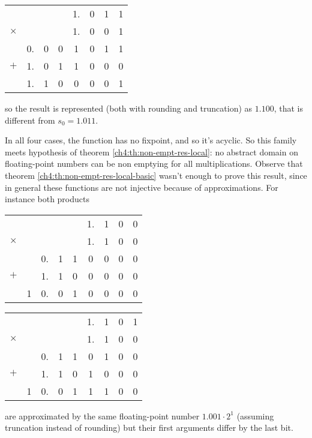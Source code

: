 \begin{example}
	\begin{center}
		\begin{tabular}{c@{\;}c@{\,}c@{\,}c@{\,}c@{\,}c@{\,}c@{\,}c}
			& & & & 1. & 0 & 1 & 1 \\
			$\times$ & & & & 1. & 0 & 0 & 1 \\
			\hline
			& 0. & 0 & 0 & 1 & 0 & 1 & 1 \\
			$+$ & 1. & 0 & 1 & 1 & 0 & 0 & 0 \\
			\hline
			& 1. & 1 & 0 & 0 & 0 & 0 & 1
		\end{tabular}
	\end{center}
	so the result is represented (both with rounding and truncation) as $1.100$, that is different from $s_0 = 1.011$.

	In all four cases, the function has no fixpoint, and so it's acyclic. So this family meets hypothesis of theorem \ref{ch4:th:non-empt-res-local}: no abstract domain on floating-point numbers can be non emptying for all multiplications.
	Observe that theorem \ref{ch4:th:non-empt-res-local-basic} wasn't enough to prove this result, since in general these functions are not injective because of approximations. For instance both products
	\begin{center}
	\parbox{0.45\textwidth}{\centering
	\begin{tabular}{c@{\;}c@{\;}c@{\,}c@{\,}c@{\,}c@{\,}c@{\,}c@{\,}c}
		& & & & & 1. & 1 & 0 & 0 \\
		$\times$ & & & & & 1. & 1 & 0 & 0 \\
		\hline
		& & 0. & 1 & 1 & 0 & 0 & 0 & 0\\
		$+$ & & 1. & 1 & 0 & 0 & 0 & 0 & 0 \\
		\hline
		& 1 & 0. & 0 & 1 & 0 & 0 & 0 & 0
	\end{tabular}}
	\parbox{0.45\textwidth}{\centering
	\begin{tabular}{c@{\;}c@{\;}c@{\,}c@{\,}c@{\,}c@{\,}c@{\,}c@{\,}c}
		& & & & & 1. & 1 & 0 & 1 \\
		$\times$ & & & & & 1. & 1 & 0 & 0 \\
		\hline
		& & 0. & 1 & 1 & 0 & 1 & 0 & 0\\
		$+$ & & 1. & 1 & 0 & 1 & 0 & 0 & 0 \\
		\hline
		& 1 & 0. & 0 & 1 & 1 & 1 & 0 & 0
	\end{tabular}}
	\end{center}
	are approximated by the same floating-point number $1.001 \cdot 2^1$ (assuming truncation instead of rounding) but their first arguments differ by the last bit.
\end{example}

